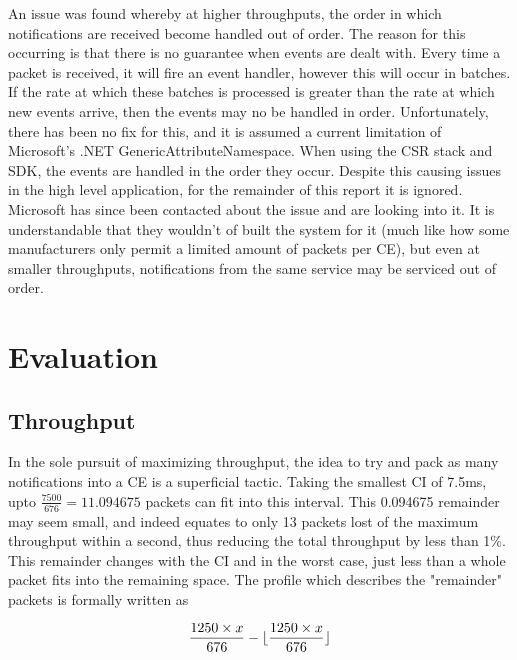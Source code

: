 \documentclass[]{article}
\DeclarePairedDelimiter\floor{\lfloor}{\rfloor}
\begin{document}
An issue was found whereby at higher throughputs, the order in which notifications are received become handled out of order. The reason for this occurring is that there is no guarantee when events are dealt with. Every time a packet is received, it will fire an event handler, however this will occur in batches. If the rate at which these batches is processed is greater than the rate at which new events arrive, then the events may no be handled in order. Unfortunately, there has been no fix for this, and it is assumed a current limitation of Microsoft's .NET GenericAttributeNamespace. When using the \ac{CSR} stack and \ac{SDK}, the events are handled in the order they occur. Despite this causing issues in the high level application, for the remainder of this report it is ignored. Microsoft has since been contacted about the issue and are looking into it. It is understandable that they wouldn't of built the system for it (much like how some manufacturers only permit a limited amount of packets per \ac{CE}), but even at smaller throughputs, notifications from the same service may be serviced out of order. 





\clearpage



\clearpage
\section{Evaluation}

\subsection{Throughput}

In the sole pursuit of maximizing throughput, the idea to try and pack as many notifications into a \ac{CE} is a superficial tactic. Taking the smallest \ac{CI} of 7.5ms, upto $\frac{7500}{676} = 11.094675$ packets can fit into this interval. This 0.094675 remainder may seem small, and indeed equates to only 13 packets lost of the maximum throughput within a second, thus reducing the total throughput by less than 1$\%$. This remainder changes with the \ac{CI} and in the worst case, just less than a whole packet fits into the remaining space. The profile which describes the "remainder" packets is formally written as

\begin{displaymath}
 \frac{1250\times x}{676}  - \floor{ \frac{1250\times x}{676}}
\end{displaymath}
\end{document}
